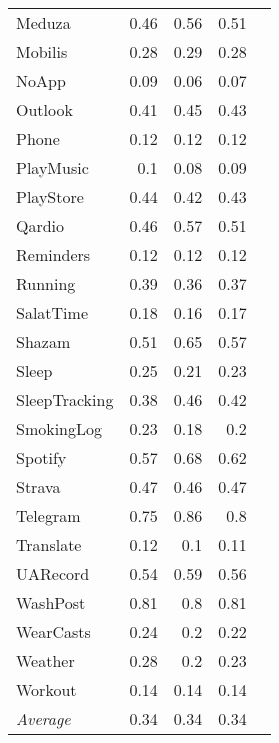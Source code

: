 \begin{tabular}{lrrrr}
    Meduza & 0.46 & 0.56 & 0.51 \\
    Mobilis & 0.28 & 0.29 & 0.28 \\
    NoApp & 0.09 & 0.06 & 0.07 \\
    Outlook & 0.41 & 0.45 & 0.43 \\
    Phone & 0.12 & 0.12 & 0.12 \\
    PlayMusic & 0.1 & 0.08 & 0.09 \\
    PlayStore & 0.44 & 0.42 & 0.43 \\
    Qardio & 0.46 & 0.57 & 0.51 \\
    Reminders & 0.12 & 0.12 & 0.12 \\
    Running & 0.39 & 0.36 & 0.37 \\
    SalatTime & 0.18 & 0.16 & 0.17 \\
    Shazam & 0.51 & 0.65 & 0.57 \\
    Sleep & 0.25 & 0.21 & 0.23 \\
    SleepTracking & 0.38 & 0.46 & 0.42 \\
    SmokingLog & 0.23 & 0.18 & 0.2 \\
    Spotify & 0.57 & 0.68 & 0.62 \\
    Strava & 0.47 & 0.46 & 0.47 \\
    Telegram & 0.75 & 0.86 & 0.8 \\
    Translate & 0.12 & 0.1 & 0.11 \\
    UARecord & 0.54 & 0.59 & 0.56 \\
    WashPost & 0.81 & 0.8 & 0.81 \\
    WearCasts & 0.24 & 0.2 & 0.22 \\
    Weather & 0.28 & 0.2 & 0.23 \\
    Workout & 0.14 & 0.14 & 0.14 \\
    \emph{Average} & 0.34 & 0.34 & 0.34 \\
\end{tabular}